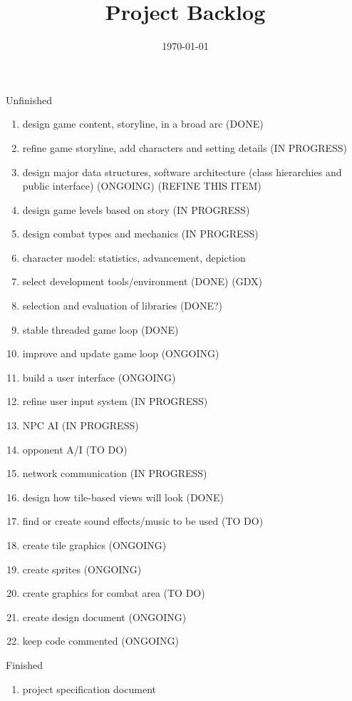 \documentclass[12pt]{article}
\title{Project Backlog}
\date{\today}
\begin{document}
\maketitle

\begin{section}{Unfinished}
\begin{enumerate}

\item design game content, storyline, in a broad arc (DONE)
\item refine game storyline, add characters and setting details (IN PROGRESS)

\item design major data structures, software architecture (class
	hierarchies and public interface) (ONGOING) (REFINE THIS ITEM)
	
\item design game levels based on story (IN PROGRESS)
\item design combat types and mechanics (IN PROGRESS)

\item character model: statistics, advancement, depiction

\item select development tools/environment (DONE) (GDX)
\item selection and evaluation of libraries (DONE?)

\item stable threaded game loop (DONE)
\item improve and update game loop (ONGOING)
\item build a user interface (ONGOING)
\item refine user input system (IN PROGRESS)

\item NPC AI (IN PROGRESS)
\item opponent A/I (TO DO)

\item network communication (IN PROGRESS)

\item design how tile-based views will look (DONE)
\item find or create sound effects/music to be used (TO DO)
\item create tile graphics (ONGOING)
\item create sprites (ONGOING)
\item create graphics for combat area (TO DO)

\item create design document (ONGOING)
\item keep code commented (ONGOING)


\end{enumerate}
\end{section}

\begin{section}{Finished}
\begin{enumerate}

\item project specification document

\end{enumerate}
\end{section}
\end{document}
